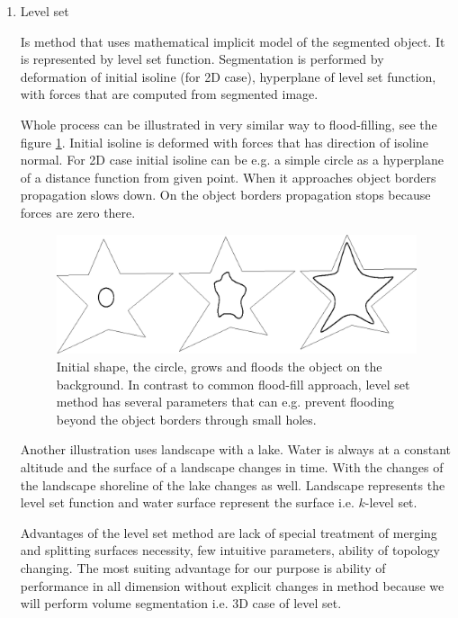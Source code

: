 \begin{enumerate}
  \item Level set

\par
Is method that uses mathematical implicit model of the segmented object.
It is represented by level set function.
Segmentation is performed by deformation of initial isoline (for 2D case), hyperplane of level set function, with forces that are computed from segmented image.

\par
Whole process can be illustrated in very similar way to flood-filling, see the figure \ref{fg:flooding}.
Initial isoline is deformed with forces that has direction of isoline normal.
For 2D case initial isoline can be e.g. a simple circle as a hyperplane of a distance function from given point.
When it approaches object borders propagation slows down.
On the object borders propagation stops because forces are zero there.

\begin{figure}
    \centering
    \includegraphics[width=12cm]{data/flooding}
    \caption[Flooding an object]{Initial shape, the circle, grows and floods the object on the background. In contrast to common flood-fill approach, level set method has several parameters that can e.g. prevent flooding beyond the object borders through small holes.}
    \label{fg:flooding}
\end{figure}

\par
Another illustration uses landscape with a lake.
Water is always at a constant altitude and the surface of a landscape changes in time.
With the changes of the landscape shoreline of the lake changes as well.
Landscape represents the level set function and water surface represent the surface i.e. $k$-level set.

\par
Advantages of the level set method are lack of special treatment of merging and splitting surfaces necessity, few intuitive parameters, ability of topology changing.
The most suiting advantage for our purpose is ability of performance in all dimension without explicit changes in method because we will perform volume segmentation i.e. 3D case of level set.

\end{enumerate}


